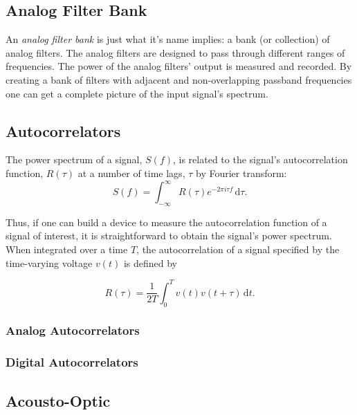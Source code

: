 \documentclass{article}
\begin{document}
\subsection{Analog Filter Bank}\label{analog-filter-bank}

An \emph{analog filter bank} is just what it's name implies: a bank (or
collection) of analog filters. The analog filters are designed to pass
through different ranges of frequencies. The power of the analog
filters' output is measured and recorded. By creating a bank of filters
with adjacent and non-overlapping passband frequencies one can get a
complete picture of the input signal's spectrum.

\subsection{Autocorrelators}\label{autocorrelators}
The power spectrum of a signal, $S(f)$,  is related to the signal's autocorrelation function, $R(\tau)$ at a number of time lags, $\tau$ by Fourier transform:
\begin{equation}
\label{spec-from-autocorr}
 S(f) = \int_{-\infty}^{\infty} R(\tau)e^{-2\pi i \tau f} \,\mathrm{d}\tau .
\end{equation}

Thus, if one can build a device to measure the autocorrelation function of a signal of interest, it is straightforward to obtain the signal's power spectrum.
When integrated over a time $T$, the autocorrelation of a signal specified by the time-varying voltage $v(t)$ is defined by 

\begin{equation}
\label{autocorr}
 R(\tau) = \frac{1}{2T} \int_{0}^{T} v(t)v(t+\tau) \,\mathrm{d}t .
\end{equation}



\subsubsection{Analog Autocorrelators}\label{analog-autocorrelators}

\subsubsection{Digital Autocorrelators}\label{digital-autocorrelators}

\subsection{Acousto-Optic}\label{acousto-optic}
\end{document}
